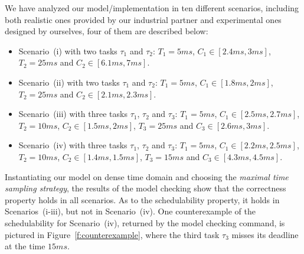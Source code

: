 \documentclass[10pt,journal]{IEEEtran}
\newcommand{\hide}[1]{\ignorespaces}
\begin{document}
We have analyzed our model/implementation in ten different scenarios,
including both realistic ones provided by our industrial partner and
experimental ones designed by ourselves, four of them are described
below:
\begin{itemize}
\item Scenario~(i) with two tasks $\tau_1$ and $\tau_2$: $T_1=5ms$,
  $C_1\in [2.4ms, 3ms]$, $T_2=25ms$ and $C_2\in [6.1ms, 7ms]$.
\item Scenario~(ii) with two tasks $\tau_1$ and $\tau_2$: $T_1=5ms$,
  $C_1\in [1.8ms, 2ms]$, $T_2=25ms$ and $C_2\in [2.1ms, 2.3ms]$.
\item Scenario~(iii) with three tasks $\tau_1$, $\tau_2$ and $\tau_3$:
  $T_1=5ms$, $C_1\in [2.5ms, 2.7ms]$, $T_2=10ms$, $C_2\in [1.5ms,
  2ms]$, $T_3=25ms$ and $C_3\in [2.6ms, 3ms]$.
\item Scenario~(iv) with three tasks $\tau_1$, $\tau_2$ and $\tau_3$:
  $T_1=5ms$, $C_1\in [2.2ms, 2.5ms]$, $T_2=10ms$, $C_2\in [1.4ms,
  1.5ms]$, $T_3=15ms$ and $C_3\in [4.3ms, 4.5ms]$.
\end{itemize}

\hide{
\begin{itemize}
\item Scenario (i) with two tasks: one having period $5ms$ and
  computation requirement $[2.4ms, 3ms]$, and the other having period
  $25ms$ and computation requirement $[6.1ms, 7ms]$.
\item Scenario (ii) with two tasks: one having period $5ms$ and
  computation requirement $[1.8ms, 2ms]$, and the other having period
  $25ms$ and computation requirement $[2.1ms, 2.3ms]$.
\item Scenario (iii) with three tasks: the first having period $5ms$
  and computation requirement $[2.5ms, 2.7ms]$, the second having
  period $10ms$ and computation requirement $[1.5ms, 2ms]$, and the
  third having period $25ms$ and computation requirement $[2.6ms,
    3ms]$.
\item Scenario (iv) with three tasks: the first having period $5ms$
  and computation requirement $[2.2ms, 2.5ms]$, the second having
  period $10ms$ and computation requirement $[1.4ms, 1.5ms]$, and the
  third having period $15ms$ and computation requirement $[4.3ms,
    4.5ms]$.
\end{itemize}
}

Instantiating our model on dense time domain and choosing the
\emph{maximal time sampling strategy}, the results of the model
checking show that the correctness property holds in all scenarios. As
to the schedulability property, it holds in Scenarios~(i-iii), but not
in Scenario~(iv).  One counterexample of the schedulability for
Scenario~(iv), returned by the model checking command, is pictured in
Figure~\ref{f:counterexample}, where the third task $\tau_3$ misses
its deadline at the time $15ms$.
\end{document}
